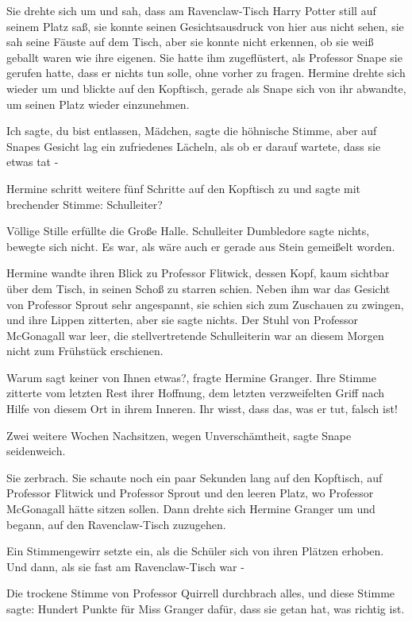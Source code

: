 Sie drehte sich um und sah, dass am Ravenclaw-Tisch Harry Potter still auf
seinem Platz saß, sie konnte seinen Gesichtsausdruck von hier aus nicht sehen,
sie sah seine Fäuste auf dem Tisch, aber sie konnte nicht erkennen, ob sie weiß
geballt waren wie ihre eigenen. Sie hatte ihm zugeflüstert, als Professor Snape
sie gerufen hatte, dass er nichts tun solle, ohne vorher zu fragen. Hermine
drehte sich wieder um und blickte auf den Kopftisch, gerade als Snape sich von
ihr abwandte, um seinen Platz wieder einzunehmen.

\glqq{}Ich sagte, du bist entlassen, Mädchen\grqq{}, sagte die höhnische Stimme,
aber auf Snapes Gesicht lag ein zufriedenes Lächeln, als ob er darauf wartete,
dass sie etwas tat -

Hermine schritt weitere fünf Schritte auf den Kopftisch zu und sagte mit
brechender Stimme: \glqq{}Schulleiter?\grqq{}

Völlige Stille erfüllte die Große Halle. Schulleiter Dumbledore sagte nichts,
bewegte sich nicht. Es war, als wäre auch er gerade aus Stein gemeißelt worden.

Hermine wandte ihren Blick zu Professor Flitwick, dessen Kopf, kaum sichtbar
über dem Tisch, in seinen Schoß zu starren schien. Neben ihm war das Gesicht von
Professor Sprout sehr angespannt, sie schien sich zum Zuschauen zu zwingen, und
ihre Lippen zitterten, aber sie sagte nichts. Der Stuhl von Professor McGonagall
war leer, die stellvertretende Schulleiterin war an diesem Morgen nicht zum
Frühstück erschienen.

\glqq{}Warum sagt keiner von Ihnen etwas?\grqq{}, fragte Hermine Granger. Ihre
Stimme zitterte vom letzten Rest ihrer Hoffnung, dem letzten verzweifelten Griff
nach Hilfe von diesem Ort in ihrem Inneren. \glqq{}Ihr wisst, dass das, was er
tut, falsch ist!\grqq{}

\glqq{}Zwei weitere Wochen Nachsitzen, wegen Unverschämtheit\grqq{}, sagte Snape
seidenweich.

Sie zerbrach. Sie schaute noch ein paar Sekunden lang auf den Kopftisch, auf
Professor Flitwick und Professor Sprout und den leeren Platz, wo Professor
McGonagall hätte sitzen sollen. Dann drehte sich Hermine Granger um und begann,
auf den Ravenclaw-Tisch zuzugehen.

Ein Stimmengewirr setzte ein, als die Schüler sich von ihren Plätzen erhoben.
Und dann, als sie fast am Ravenclaw-Tisch war -

Die trockene Stimme von Professor Quirrell durchbrach alles, und diese Stimme
sagte: \glqq{}Hundert Punkte für Miss Granger dafür, dass sie getan hat, was
richtig ist.\grqq{}

